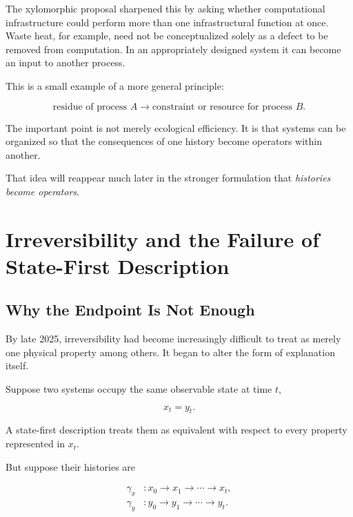 \documentclass[11pt]{article}
\theoremstyle{remark}
\begin{document}
The xylomorphic proposal sharpened this by asking whether computational infrastructure could perform more than one infrastructural function at once. Waste heat, for example, need not be conceptualized solely as a defect to be removed from computation. In an appropriately designed system it can become an input to another process.

This is a small example of a more general principle:

\begin{equation}
\text{residue of process } A
\longrightarrow
\text{constraint or resource for process } B.
\end{equation}

The important point is not merely ecological efficiency. It is that systems can be organized so that the consequences of one history become operators within another.

That idea will reappear much later in the stronger formulation that \emph{histories become operators}.

\section{Irreversibility and the Failure of State-First Description}

\subsection{Why the Endpoint Is Not Enough}

By late 2025, irreversibility had become increasingly difficult to treat as merely one physical property among others. It began to alter the form of explanation itself.

Suppose two systems occupy the same observable state at time $t$,

\begin{equation}
x_t = y_t.
\end{equation}

A state-first description treats them as equivalent with respect to every property represented in $x_t$.

But suppose their histories are

\begin{align}
\gamma_x &: x_0 \rightarrow x_1 \rightarrow \cdots \rightarrow x_t,\\
\gamma_y &: y_0 \rightarrow y_1 \rightarrow \cdots \rightarrow y_t.
\end{align}
\end{document}
